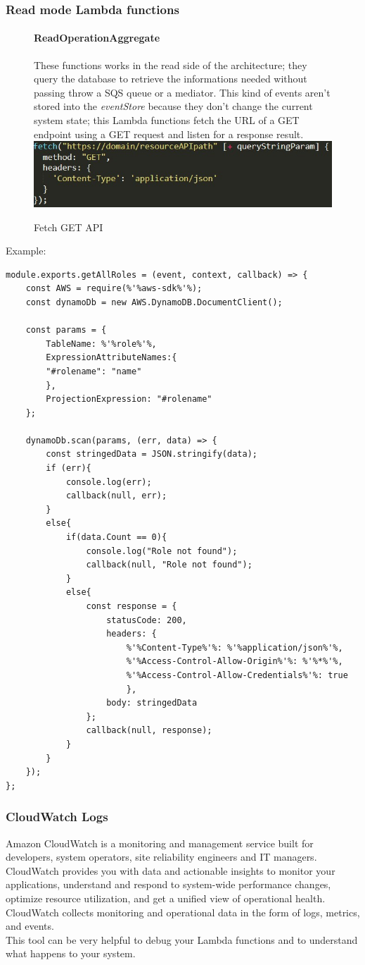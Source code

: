 \subsubsection{Read mode Lambda functions}
\begin{figure} [H]
\paragraph{ReadOperationAggregate} \Spazio
These functions works in the read side of the architecture; they query the database to retrieve the informations needed without passing throw a SQS queue or a mediator. This kind of events aren't stored into the \emph{eventStore} because they don't change the current system state; this Lambda functions fetch the URL of a GET endpoint using a GET request and listen for a response result. \\

	\centering
	\includegraphics[scale=1.2]{../Img/fetchGET}
	\caption{Fetch GET API}\label{}
\end{figure}
Example:
\begin{lstlisting}[escapechar=\%]
module.exports.getAllRoles = (event, context, callback) => {
	const AWS = require(%'%aws-sdk%'%);
	const dynamoDb = new AWS.DynamoDB.DocumentClient();
	
	const params = {
		TableName: %'%role%'%,
		ExpressionAttributeNames:{
		"#rolename": "name" 
		},
		ProjectionExpression: "#rolename"
	};
	
	dynamoDb.scan(params, (err, data) => {
		const stringedData = JSON.stringify(data);
		if (err){
			console.log(err);
			callback(null, err);
		}
		else{
			if(data.Count == 0){
				console.log("Role not found");
				callback(null, "Role not found");
			}  
			else{
				const response = {
					statusCode: 200,
					headers: {
						%'%Content-Type%'%: %'%application/json%'%,
						%'%Access-Control-Allow-Origin%'%: %'%*%'%,
						%'%Access-Control-Allow-Credentials%'%: true
						},
					body: stringedData
				};
				callback(null, response);
			}      
		}
	});
};
\end{lstlisting}

\subsubsection{CloudWatch Logs}
Amazon CloudWatch is a monitoring and management service built for developers, system operators, site reliability engineers and IT managers. CloudWatch provides you with data and actionable insights to monitor your applications, understand and respond to system-wide performance changes, optimize resource utilization, and get a unified view of operational health. CloudWatch collects monitoring and operational data in the form of logs, metrics, and events. \\
This tool can be very helpful to debug your Lambda functions and to understand what happens to your system.

